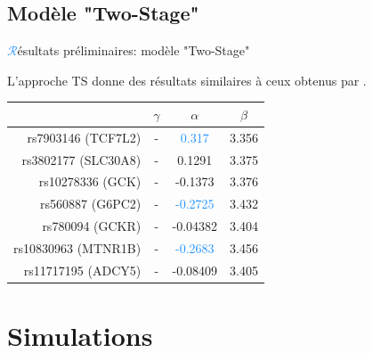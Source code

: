 \subsection{Modèle "Two-Stage"}
\begin{frame}{{\huge\textcolor{dodgerblue}{$\mathcal{R}$}}ésultats préliminaires: modèle "Two-Stage"}
\par{L'approche \textcolor{springgreen3}{TS} donne des résultats similaires à ceux obtenus par .
\begin{center}
    \begin{tabular}{rccc}
        \hline
        & $\gamma$ & $\alpha$ & $\beta$ \\
        \hline
        rs7903146 (TCF7L2) & - & \textcolor{dodgerblue}{0.317} & \textcolor{firebrick2}{3.356} \\
        rs3802177 (SLC30A8) & - & 0.1291 & \textcolor{firebrick2}{3.375} \\
        rs10278336 (GCK) & - & -0.1373 & \textcolor{firebrick2}{3.376} \\
        rs560887 (G6PC2) & - & \textcolor{dodgerblue}{-0.2725} & \textcolor{firebrick2}{3.432} \\
        rs780094 (GCKR) & - & -0.04382 & \textcolor{firebrick2}{3.404} \\
        rs10830963 (MTNR1B) & - & \textcolor{dodgerblue}{-0.2683} & \textcolor{firebrick2}{3.456} \\
        rs11717195 (ADCY5) & - & -0.08409 & \textcolor{firebrick2}{3.405} \\
        \hline
    \end{tabular}
\end{center}
}
\end{frame}


\section{Simulations}
